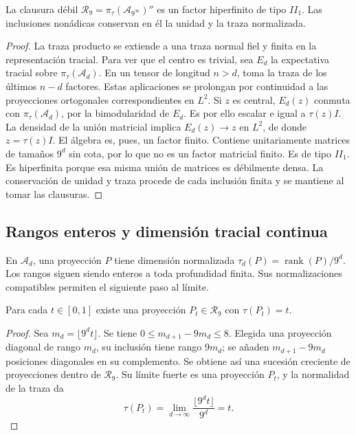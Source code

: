 \begin{theorem}
\label{x_reciprocidad:iv:thm:factor-tracial}
La clausura débil
\(\mathcal R_9=\pi_\tau(\mathcal A_{9^\infty})''\)
es un factor hiperfinito de tipo \(II_1\). Las inclusiones
nonádicas conservan en él la unidad y la traza normalizada.
\end{theorem}
\begin{proof}
La traza producto se extiende a una traza normal fiel y finita
en la representación tracial. Para ver que el centro es trivial,
sea \(E_d\) la expectativa tracial sobre \(\pi_\tau(\mathcal A_d)\).
En un tensor de longitud \(n>d\), toma la traza de los últimos
\(n-d\) factores. Estas aplicaciones se prolongan por continuidad
a las proyecciones ortogonales correspondientes en \(L^2\).
Si \(z\) es central, \(E_d(z)\) conmuta con
\(\pi_\tau(\mathcal A_d)\), por la bimodularidad de \(E_d\).
Es por ello escalar e igual a \(\tau(z)I\). La densidad de la
unión matricial implica \(E_d(z)\to z\) en \(L^2\), de donde
\(z=\tau(z)I\). El álgebra es, pues, un factor finito.
Contiene unitariamente matrices de tamaños \(9^d\) sin cota,
por lo que no es un factor matricial finito. Es de tipo \(II_1\).
Es hiperfinita porque esa misma unión de matrices es débilmente
densa. La conservación de unidad y traza procede de cada inclusión
finita y se mantiene al tomar las clausuras.
\end{proof}

\subsection{Rangos enteros y dimensión tracial continua}

En \(\mathcal A_d\), una proyección \(P\) tiene dimensión
normalizada \(\tau_d(P)=\operatorname{rank}(P)/9^d\).
Los rangos siguen siendo enteros a toda profundidad finita. Sus
normalizaciones compatibles permiten el siguiente paso al límite.

\begin{proposition}
\label{x_reciprocidad:iv:prop:dimension-tracial}
Para cada \(t\in[0,1]\) existe una proyección
\(P_t\in\mathcal R_9\) con \(\tau(P_t)=t\).
\end{proposition}
\begin{proof}
Sea \(m_d=\lfloor9^dt\rfloor\). Se tiene
\(0\leq m_{d+1}-9m_d\leq8\). Elegida una proyección diagonal
de rango \(m_d\), su inclusión tiene rango \(9m_d\); se
añaden \(m_{d+1}-9m_d\) posiciones diagonales en su complemento.
Se obtiene así una sucesión creciente de proyecciones dentro de
\(\mathcal R_9\). Su límite fuerte es una proyección \(P_t\),
y la normalidad de la traza da
\[
 \tau(P_t)=\lim_{d\to\infty}\frac{\lfloor9^dt\rfloor}{9^d}=t.
\]
\end{proof}

